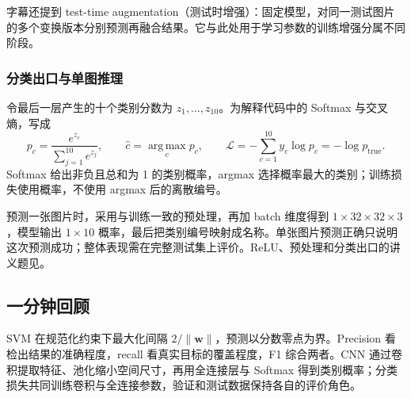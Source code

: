 字幕还提到 test-time augmentation（测试时增强）：固定模型，对同一测试图片的多个变换版本分别预测再融合结果。它与此处用于学习参数的训练增强分属不同阶段。

\subsubsection*{分类出口与单图推理}

令最后一层产生的十个类别分数为 $z_1,\ldots,z_{10}$。为解释代码中的 Softmax 与交叉熵，写成
\[
  p_c=\frac{e^{z_c}}{\sum_{j=1}^{10}e^{z_j}},
  \qquad \widehat c=\operatorname*{arg\,max}_c p_c,
  \qquad
  \mathcal L=-\sum_{c=1}^{10}y_c\log p_c=-\log p_{\mathrm{true}}.
\]
Softmax 给出非负且总和为 1 的类别概率，argmax 选择概率最大的类别；训练损失使用概率，不使用 argmax 后的离散编号。

预测一张图片时，采用与训练一致的预处理，再加 batch 维度得到
$1\times32\times32\times3$，模型输出 $1\times10$ 概率，最后把类别编号映射成名称。单张图片预测正确只说明这次预测成功；整体表现需在完整测试集上评价。ReLU、预处理和分类出口的讲义题见。

\subsection{一分钟回顾}

SVM 在规范化约束下最大化间隔 $2/\|\bm w\|$，预测以分数零点为界。Precision 看检出结果的准确程度，recall 看真实目标的覆盖程度，F1 综合两者。CNN 通过卷积提取特征、池化缩小空间尺寸，再用全连接层与 Softmax 得到类别概率；分类损失共同训练卷积与全连接参数，验证和测试数据保持各自的评价角色。
